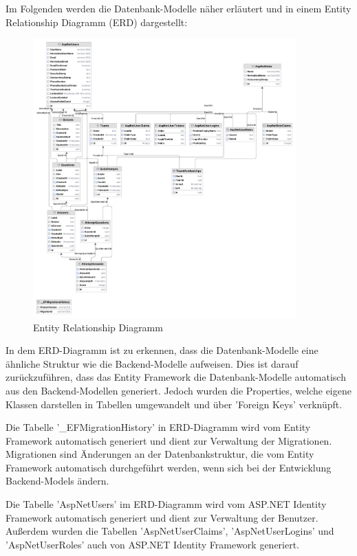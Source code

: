 \noindent Im Folgenden werden die Datenbank-Modelle näher erläutert und in einem Entity Relationship Diagramm (ERD) dargestellt:

\begin{figure}[H]
  \centering
  \includegraphics[width=0.9\textwidth]{img/ERD-Diagramm.png}
  \caption{Entity Relationship Diagramm}
\end{figure}

\noindent In dem ERD-Diagramm ist zu erkennen, dass die Datenbank-Modelle eine ähnliche Struktur wie die Backend-Modelle aufweisen.
Dies ist darauf zurückzuführen, dass das Entity Framework die Datenbank-Modelle automatisch aus den Backend-Modellen generiert. 
Jedoch wurden die Properties, welche eigene Klassen darstellen in Tabellen umgewandelt und über 'Foreign Keys' verknüpft. \newline

\noindent Die Tabelle '\_EFMigrationHistory' in ERD-Diagramm wird vom Entity Framework automatisch generiert und dient zur Verwaltung der Migrationen.
Migrationen sind Änderungen an der Datenbankstruktur, die vom Entity Framework automatisch durchgeführt werden, wenn sich bei der Entwicklung
Backend-Models ändern. \newline

\noindent Die Tabelle 'AspNetUsers' im ERD-Diagramm wird vom ASP.NET Identity Framework automatisch generiert und dient zur Verwaltung der Benutzer.
Außerdem wurden die Tabellen 'AspNetUserClaims', 'AspNetUserLogins' und 'AspNetUserRoles' auch von ASP.NET Identity Framework generiert.

